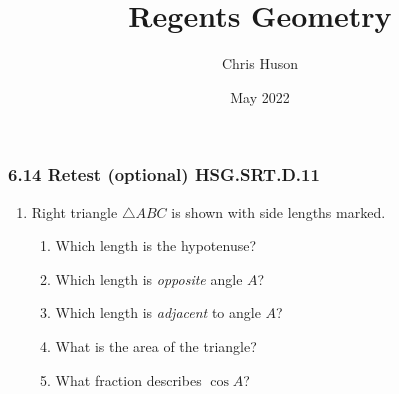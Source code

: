 \documentclass[12pt, twoside]{article}
\title{Regents Geometry}
\author{Chris Huson}
\date{May 2022}
\begin{document}
\subsubsection*{6.14 Retest (optional) \hfill HSG.SRT.D.11}

\begin{enumerate}
  \item Right triangle $\triangle ABC$ is shown with side lengths marked.
  \begin{multicols}{2}
    \begin{enumerate}
      \item Which length is the hypotenuse? \vspace{0.5cm}
      \item Which length is \emph{opposite} angle $A$?  \vspace{0.5cm}
      \item Which length is \emph{adjacent} to angle $A$? %
      \item What is the area of the triangle? \vspace{1cm}
      \item What fraction describes $\cos A$? \vspace{1cm}
    \end{enumerate}
  \begin{flushright}
  \end{flushright}
  \end{multicols}
  

\end{enumerate}
\end{document}
